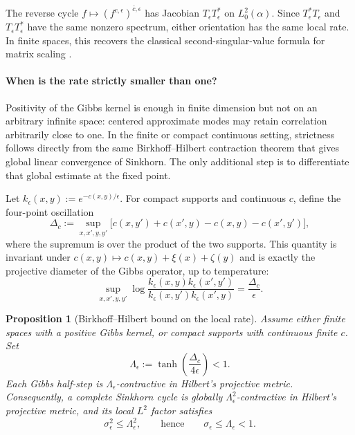 \documentclass[11pt]{article}
\newtheorem{proposition}{Proposition}[section]
\theoremstyle{definition}
\theoremstyle{remark}
\newcommand{\eps}{\epsilon}
\newcommand{\al}{\alpha}
\begin{document}
The reverse cycle $f\mapsto(f^{c,\eps})^{\bar c,\eps}$ has Jacobian
$T_\eps T_\eps^\ast$ on
$L_0^2(\al)$. Since $T_\eps^\ast T_\eps$ and
$T_\eps T_\eps^\ast$ have the same nonzero
spectrum, either orientation has the same local rate. In finite
spaces, this recovers the classical second-singular-value formula for
matrix scaling \cite{Knight2008,LehmannEtAl2022}.

\paragraph{When is the rate strictly smaller than one?}
Positivity of the Gibbs kernel is enough in finite dimension but not on
an arbitrary infinite space: centered approximate modes may retain
correlation arbitrarily close to one. In the finite or compact
continuous setting, strictness follows directly from the same
Birkhoff--Hilbert contraction theorem that gives global linear
convergence of Sinkhorn. The only additional step is to differentiate
that global estimate at the fixed point.

Let $k_\eps(x,y):=e^{-c(x,y)/\eps}$. For compact supports and continuous
$c$, define the four-point oscillation
\begin{equation}
  \label{eq:four-point-cost-oscillation}
  \Delta_c
  :=
  \sup_{x,x',y,y'}
  \bigl[c(x,y')+c(x',y)-c(x,y)-c(x',y')\bigr],
\end{equation}
where the supremum is over the product of the two supports.
This quantity is invariant under $c(x,y)\mapsto
c(x,y)+\xi(x)+\zeta(y)$ and is exactly the projective diameter of the
Gibbs operator, up to temperature:
\begin{equation}
  \label{eq:gibbs-projective-diameter}
  \sup_{x,x',y,y'}
  \log
  \frac{k_\eps(x,y)k_\eps(x',y')}
       {k_\eps(x,y')k_\eps(x',y)}
  =
  \frac{\Delta_c}{\eps}.
\end{equation}

\begin{proposition}[Birkhoff--Hilbert bound on the local rate]
  \label{prop:strict-gap}
  Assume either finite spaces with a positive Gibbs kernel, or compact
  supports with continuous finite $c$. Set
  \begin{equation}
    \label{eq:birkhoff-local-bound}
    \Lambda_\eps
    :=
    \tanh\left(\frac{\Delta_c}{4\eps}\right)<1.
  \end{equation}
  Each Gibbs half-step is $\Lambda_\eps$-contractive in Hilbert's
  projective metric. Consequently, a complete Sinkhorn cycle is globally
  $\Lambda_\eps^2$-contractive in Hilbert's projective metric, and its
  local $L^2$ factor satisfies
  \begin{equation}
    \label{eq:birkhoff-controls-sigma}
    \sigma_\eps^2\leq\Lambda_\eps^2,
    \qquad\text{hence}\qquad
    \sigma_\eps\leq\Lambda_\eps<1.
  \end{equation}
\end{proposition}
\end{document}
